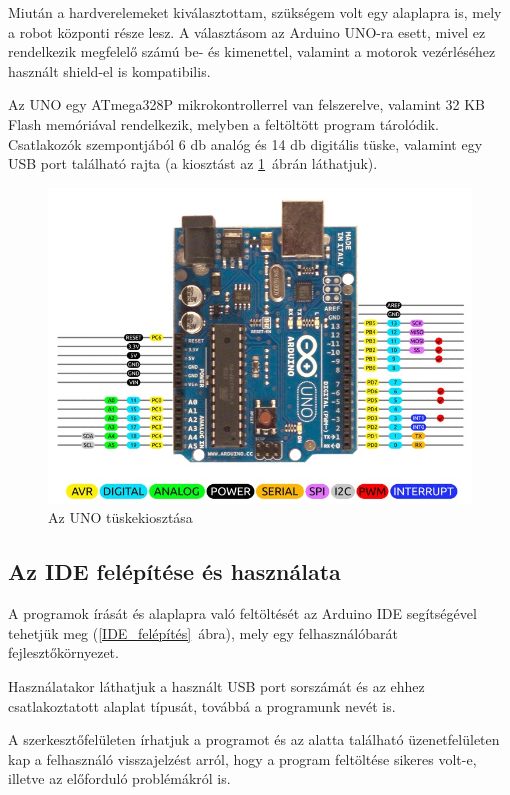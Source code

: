 \documentclass[]{thesis-ekf}
\theoremstyle{definition}
\begin{document}
Miután a hardverelemeket kiválasztottam, szükségem volt egy alaplapra is, mely a robot központi része lesz. A választásom az Arduino UNO-ra esett, mivel ez rendelkezik megfelelő számú be- és kimenettel, valamint a motorok vezérléséhez használt shield-el is kompatibilis.

Az UNO egy ATmega328P mikrokontrollerrel van felszerelve, valamint 32 KB Flash memóriával rendelkezik, melyben a feltöltött program tárolódik. Csatlakozók szempontjából 6 db analóg és 14 db digitális tüske, valamint egy USB port található rajta (a kiosztást az \ref{uno_pins}~ábrán láthatjuk).
\begin{figure}[h]
	\centering
	\includegraphics[width=\linewidth]{images/arduino/Uno_Pins}
	\caption{Az UNO tüskekiosztása}
	\label{uno_pins}
\end{figure}
\subsection{Az IDE felépítése és használata}\label{arduino-IDE}
A programok írását és alaplapra való feltöltését az Arduino IDE segítségével tehetjük meg (\ref{IDE_felépítés}~ábra), mely egy felhasználóbarát fejlesztőkörnyezet.

Használatakor láthatjuk a használt USB port sorszámát és az ehhez csatlakoztatott alaplat típusát, továbbá a programunk nevét is.

A szerkesztőfelületen írhatjuk a programot és az alatta található üzenetfelületen kap a felhasználó visszajelzést arról, hogy a program feltöltése sikeres volt-e, illetve az előforduló problémákról is.
\end{document}
